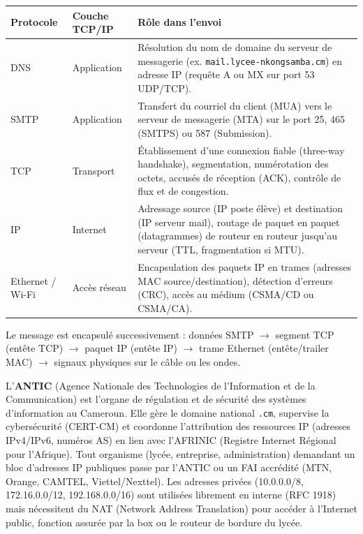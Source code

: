 \documentclass[11pt]{article}
\begin{document}
\begin{exoresolu}
\begin{center}
\begin{tabularx}{\linewidth}{|l|l|X|}
\hline
\rowcolor{popblueL} \textbf{Protocole} & \textbf{Couche TCP/IP} & \textbf{Rôle dans l'envoi} \\
\hline
DNS & Application & Résolution du nom de domaine du serveur de messagerie (ex. \texttt{mail.lycee-nkongsamba.cm}) en adresse IP (requête A ou MX sur port 53 UDP/TCP). \\
\hline
SMTP & Application & Transfert du courriel du client (MUA) vers le serveur de messagerie (MTA) sur le port 25, 465 (SMTPS) ou 587 (Submission). \\
\hline
TCP & Transport & Établissement d'une connexion fiable (three-way handshake), segmentation, numérotation des octets, accusés de réception (ACK), contrôle de flux et de congestion. \\
\hline
IP & Internet & Adressage source (IP poste élève) et destination (IP serveur mail), routage de paquet en paquet (datagrammes) de routeur en routeur jusqu'au serveur (TTL, fragmentation si MTU). \\
\hline
Ethernet / Wi-Fi & Accès réseau & Encapsulation des paquets IP en trames (adresses MAC source/destination), détection d'erreurs (CRC), accès au médium (CSMA/CD ou CSMA/CA). \\
\hline
\end{tabularx}
\end{center}

Le message est encapsulé successivement : données SMTP $\to$ segment TCP (entête TCP) $\to$ paquet IP (entête IP) $\to$ trame Ethernet (entête/trailer MAC) $\to$ signaux physiques sur le câble ou les ondes.

\begin{savaistu}
L'\textbf{ANTIC} (Agence Nationale des Technologies de l'Information et de la Communication) est l'organe de régulation et de sécurité des systèmes d'information au Cameroun. Elle gère le domaine national \texttt{.cm}, supervise la cybersécurité (CERT-CM) et coordonne l'attribution des ressources IP (adresses IPv4/IPv6, numéros AS) en lien avec l'AFRINIC (Registre Internet Régional pour l'Afrique). Tout organisme (lycée, entreprise, administration) demandant un bloc d'adresses IP publiques passe par l'ANTIC ou un FAI accrédité (MTN, Orange, CAMTEL, Viettel/Nexttel). Les adresses privées (10.0.0.0/8, 172.16.0.0/12, 192.168.0.0/16) sont utilisées librement en interne (RFC 1918) mais nécessitent du NAT (Network Address Translation) pour accéder à l'Internet public, fonction assurée par la box ou le routeur de bordure du lycée.
\end{savaistu}
\end{exoresolu}
\end{document}
